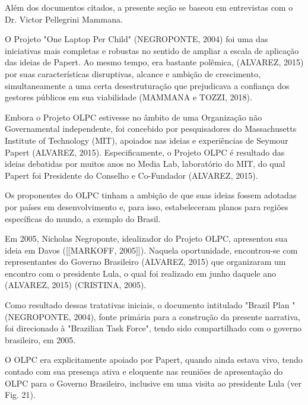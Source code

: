 Além dos documentos citados, a presente seção se baseou em entrevistas com o Dr. Victor Pellegrini Mammana.

O Projeto "One Laptop Per Child" (NEGROPONTE, 2004) foi uma das iniciativas mais completas e robustas no sentido de ampliar a escala de aplicação das ideias de Papert. Ao mesmo tempo, era bastante polêmica, (ALVAREZ, 2015) por suas características disruptivas, alcance e ambição de crescimento, simultaneamente a uma certa desestruturação que prejudicava a confiança dos gestores públicos em sua viabilidade (MAMMANA e TOZZI, 2018).

Embora o Projeto OLPC estivesse no âmbito de uma Organização não Governamental independente,  foi concebido por pesquisadores do Massachusetts Institute of Technology (MIT), apoiados nas ideias e experiências de Seymour Papert (ALVAREZ, 2015). Especificamente, o Projeto OLPC é resultado das ideias debatidas por muitos anos no Media Lab, laboratório do MIT, do qual Papert foi Presidente do Conselho e Co-Fundador (ALVAREZ, 2015).

Os proponentes do OLPC tinham a ambição de que suas ideias fossem adotadas por países em desenvolvimento e, para isso, estabeleceram planos para regiões específicas do mundo, a exemplo do Brasil.

Em 2005, Nicholas Negroponte, idealizador do Projeto OLPC, apresentou sua ideia em Davos ([[MARKOFF, 2005]]). Naquela oportunidade, encontrou-se com representantes do Governo Brasileiro (ALVAREZ, 2015) que organizaram um encontro com o presidente Lula, o qual foi realizado em junho daquele ano (ALVAREZ, 2015) (CRISTINA, 2005).

Como resultado dessas tratativas iniciais, o documento intitulado "Brazil Plan " (NEGROPONTE, 2004), fonte primária para a construção da presente narrativa, foi direcionado à "Brazilian Task Force", tendo sido compartilhado com o governo brasileiro, em 2005.

O OLPC era explicitamente apoiado por Papert, quando ainda estava vivo, tendo contado com sua presença ativa e eloquente nas reuniões de apresentação do OLPC para o Governo Brasileiro, inclusive em uma visita ao presidente Lula (ver Fig. 21).



